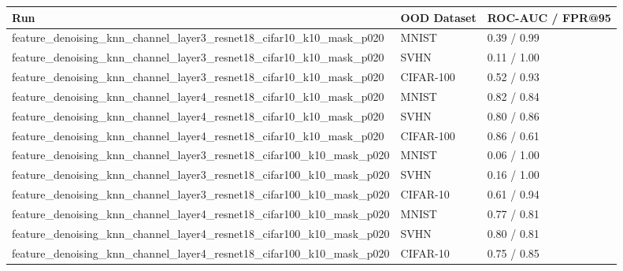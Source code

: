 \begin{tabular}{lll}
\toprule
Run & OOD Dataset & ROC-AUC / FPR@95 \\
\midrule
feature\_denoising\_knn\_channel\_layer3\_resnet18\_cifar10\_k10\_mask\_p020 & MNIST & 0.39 / 0.99 \\
feature\_denoising\_knn\_channel\_layer3\_resnet18\_cifar10\_k10\_mask\_p020 & SVHN & 0.11 / 1.00 \\
feature\_denoising\_knn\_channel\_layer3\_resnet18\_cifar10\_k10\_mask\_p020 & CIFAR-100 & 0.52 / 0.93 \\
feature\_denoising\_knn\_channel\_layer4\_resnet18\_cifar10\_k10\_mask\_p020 & MNIST & 0.82 / 0.84 \\
feature\_denoising\_knn\_channel\_layer4\_resnet18\_cifar10\_k10\_mask\_p020 & SVHN & 0.80 / 0.86 \\
feature\_denoising\_knn\_channel\_layer4\_resnet18\_cifar10\_k10\_mask\_p020 & CIFAR-100 & 0.86 / 0.61 \\
feature\_denoising\_knn\_channel\_layer3\_resnet18\_cifar100\_k10\_mask\_p020 & MNIST & 0.06 / 1.00 \\
feature\_denoising\_knn\_channel\_layer3\_resnet18\_cifar100\_k10\_mask\_p020 & SVHN & 0.16 / 1.00 \\
feature\_denoising\_knn\_channel\_layer3\_resnet18\_cifar100\_k10\_mask\_p020 & CIFAR-10 & 0.61 / 0.94 \\
feature\_denoising\_knn\_channel\_layer4\_resnet18\_cifar100\_k10\_mask\_p020 & MNIST & 0.77 / 0.81 \\
feature\_denoising\_knn\_channel\_layer4\_resnet18\_cifar100\_k10\_mask\_p020 & SVHN & 0.80 / 0.81 \\
feature\_denoising\_knn\_channel\_layer4\_resnet18\_cifar100\_k10\_mask\_p020 & CIFAR-10 & 0.75 / 0.85 \\
\bottomrule
\end{tabular}
